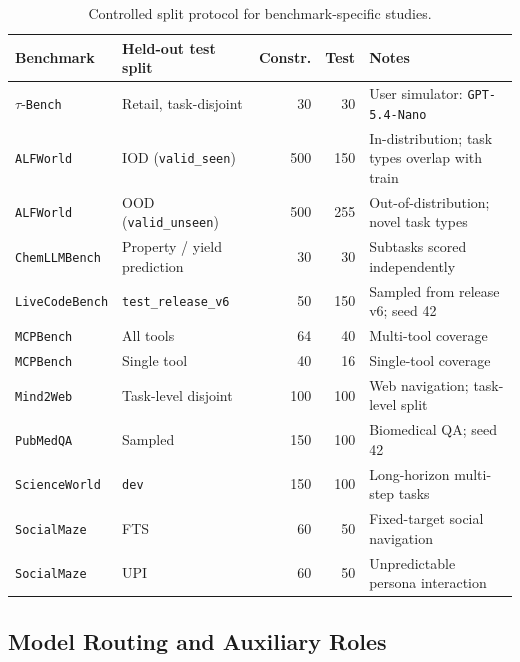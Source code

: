 \documentclass{article}
\begin{document}
\begin{table}[h]
\centering
\caption{Controlled split protocol for benchmark-specific studies.}
\label{tab:appendix-splits}
\begingroup
\small
{}
\setlength{\tabcolsep}{4pt}
\renewcommand{\arraystretch}{1.08}
\begin{tabular}{@{}p{}p{}rrp{}@{}}
\toprule
\rowcolor{sgDetailHeader}
\textbf{Benchmark} & \textbf{Held-out test split} & \textbf{Constr.} & \textbf{Test} & \textbf{Notes} \\
\midrule
\rowcolor{sgDetailStripe}
$\tau$-\texttt{Bench} & Retail, task-disjoint & 30 & 30 & User simulator: \texttt{GPT-5.4-Nano} \\
\texttt{ALFWorld} & IOD (\texttt{valid\_seen}) & 500 & 150 & In-distribution; task types overlap with train \\
\rowcolor{sgDetailStripe}
\texttt{ALFWorld} & OOD (\texttt{valid\_unseen}) & 500 & 255 & Out-of-distribution; novel task types \\
\texttt{ChemLLMBench} & Property / yield prediction & 30 & 30 & Subtasks scored independently \\
\rowcolor{sgDetailStripe}
\texttt{LiveCodeBench} & \texttt{test\_release\_v6} & 50 & 150 & Sampled from release v6; seed 42 \\
\texttt{MCPBench} & All tools & 64 & 40 & Multi-tool coverage \\
\rowcolor{sgDetailStripe}
\texttt{MCPBench} & Single tool & 40 & 16 & Single-tool coverage \\
\texttt{Mind2Web} & Task-level disjoint & 100 & 100 & Web navigation; task-level split \\
\rowcolor{sgDetailStripe}
\texttt{PubMedQA} & Sampled & 150 & 100 & Biomedical QA; seed 42 \\
\texttt{ScienceWorld} & \texttt{dev} & 150 & 100 & Long-horizon multi-step tasks \\
\rowcolor{sgDetailStripe}
\texttt{SocialMaze} & FTS & 60 & 50 & Fixed-target social navigation \\
\texttt{SocialMaze} & UPI & 60 & 50 & Unpredictable persona interaction \\
\bottomrule
\end{tabular}
\endgroup
\vspace{-5pt}
\end{table}

\subsection{Model Routing and Auxiliary Roles}
\label{app:model-routing}
\end{document}
